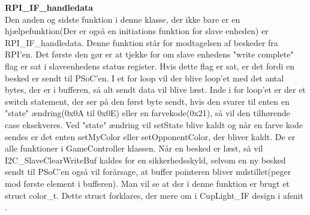 \documentclass[Softwaredesign/Softwaredesign_main.tex]{subfiles}
\begin{document}
\textbf{RPI\_IF\_handledata}\\
Den anden og sidste funktion i denne klasse, der ikke bare er en hjælpefunktion(Der er også en initiations funktion for slave enheden) er RPI\_IF\_handledata. Denne funktion står for modtagelsen af beskeder fra RPI'en. Det første den gør er at tjekke for om slave enhedens "write complete" flag er sat i slaveenhedens status register. Hvis dette flag er sat, er det fordi en besked er sendt til PSoC'en. I et for loop vil der blive loop'et med det antal bytes, der er i bufferen, så alt sendt data vil blive læst. Inde i for loop'et er der et switch statement, der ser på den først byte sendt, hvis den svarer til enten en "state" ændring(0x0A til 0x0E) eller en farvekode(0x21), så vil den tilhørende case eksekveres. Ved "state" ændring vil setState blive kaldt og når en farve kode sendes er det enten setMyColor eller setOpponentColor, der bliver kaldt. De er alle funktioner i GameController klassen. Når en besked er læst, så vil I2C\_SlaveClearWriteBuf kaldes for en sikkerhedsskyld, selvom en ny besked sendt til PSoC'en også vil forårsage, at buffer pointeren bliver nulstillet(peger mod første element i bufferen). Man vil se at der i denne funktion er brugt et struct color\_t. Dette struct forklares, der mere om i CupLight\_IF design i afsnit .
\end{document}
